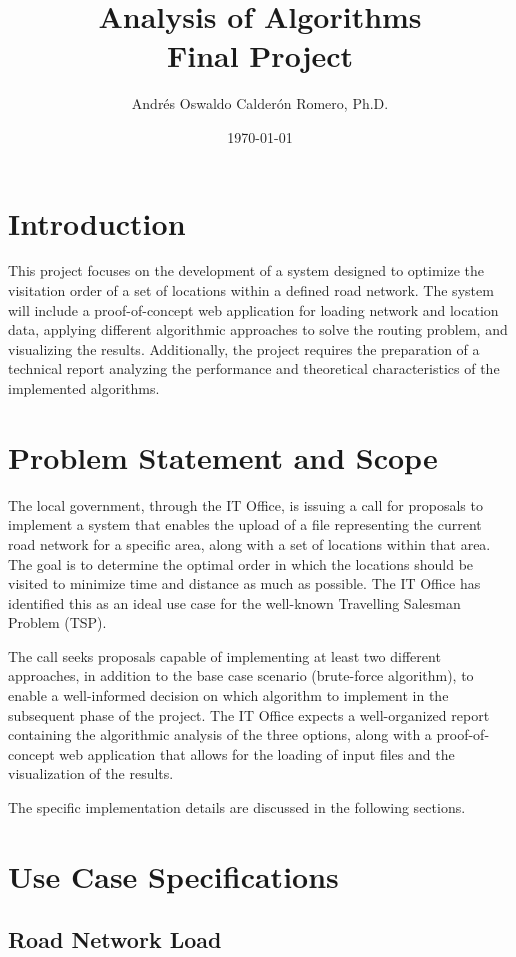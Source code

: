 \documentclass[11pt]{article}
\title{Analysis of Algorithms \\ Final Project}
\author{Andrés Oswaldo Calderón Romero, Ph.D.}
\date{\today}
\begin{document}
\maketitle

\section{Introduction}

This project focuses on the development of a system designed to optimize the visitation order of a set of locations within a defined road network. The system will include a proof-of-concept web application for loading network and location data, applying different algorithmic approaches to solve the routing problem, and visualizing the results. Additionally, the project requires the preparation of a technical report analyzing the performance and theoretical characteristics of the implemented algorithms.

\section{Problem Statement and Scope}
The local government, through the IT Office, is issuing a call for proposals to implement a system that enables the upload of a file representing the current road network for a specific area, along with a set of locations within that area. The goal is to determine the optimal order in which the locations should be visited to minimize time and distance as much as possible. The IT Office has identified this as an ideal use case for the well-known Travelling Salesman Problem (TSP).

The call seeks proposals capable of implementing at least two different approaches, in addition to the base case scenario (brute-force algorithm), to enable a well-informed decision on which algorithm to implement in the subsequent phase of the project.  The IT Office expects a well-organized report containing the algorithmic analysis of the three options, along with a proof-of-concept web application that allows for the loading of input files and the visualization of the results.

The specific implementation details are discussed in the following sections.

\section{Use Case Specifications}

\subsection{Road Network Load}
\end{document}
